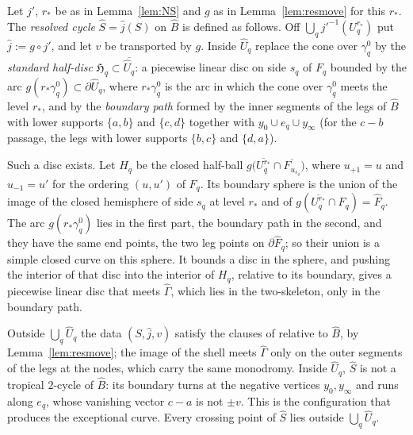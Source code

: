 \begin{definition}\label{def:resolvedcycle}
Let $j'$, $r_*$ be as in Lemma~\ref{lem:NS} and $g$ as in Lemma~\ref{lem:resmove} for this $r_*$. The \emph{resolved
cycle} $\hat S=\hat j(S)$ on $\widehat B$ is defined as follows. Off $\bigcup_qj'^{-1}(U^{r_*}_q)$ put $\hat j:=g\circ j'$, and let $v$ be
transported by $g$. Inside $\widehat U_q$ replace the cone over $\gamma^0_q$ by the \emph{standard half-disc}
$\mathfrak H_q\subset\overline{\widehat U_q}$: a piecewise linear disc on side $s_q$ of $F_q$ bounded by the arc
$g(r_*\gamma^0_q)\subset\partial\widehat U_q$, where $r_*\gamma^0_q$ is the arc in which the cone over $\gamma^0_q$ meets the
level $r_*$, and by the \emph{boundary path} formed by the inner segments of the legs of $\widehat B$ with lower supports
$\{a,b\}$ and $\{c,d\}$ together with $y_0\cup e_q\cup y_\infty$ (for the $c-b$ passage, the legs with lower supports
$\{b,c\}$ and $\{d,a\}$).
\end{definition}

Such a disc exists. Let $H_q$ be the closed half-ball $g\bigl(\overline{U^{r_*}_q}\cap\overline{F_{u_{s_q}}}\bigr)$, where
$u_{+1}=u$ and $u_{-1}=u'$ for the ordering $(u,u')$ of $F_q$. Its boundary sphere is the union of the image of the closed
hemisphere of side $s_q$ at level $r_*$ and of $g(\overline{U^{r_*}_q}\cap F_q)=\widehat F_q$. The arc $g(r_*\gamma^0_q)$ lies in
the first part, the boundary path in the second, and they have the same end points, the two leg points on
$\partial\widehat F_q$; so their union is a simple closed curve on this sphere. It bounds a disc in the sphere, and pushing
the interior of that disc into the interior of $H_q$, relative to its boundary, gives a piecewise linear disc that meets
$\widehat\Gamma$, which lies in the two-skeleton, only in the boundary path.

Outside $\bigcup_q\widehat U_q$ the data $(S,\hat j,v)$ satisfy the clauses of \cite[Def.~7.2]{CBM} relative to $\widehat B$,
by Lemma~\ref{lem:resmove}; the image of the shell meets $\widehat\Gamma$ only on the outer segments of the legs at the nodes,
which carry the same monodromy. Inside $\widehat U_q$, $\hat S$ is not a tropical $2$-cycle of $\widehat B$: its boundary turns
at the negative vertices $y_0,y_\infty$ and runs along $e_q$, whose vanishing vector $c-a$ is not $\pm v$. This is the
configuration that produces the exceptional curve. Every crossing point of $\hat S$ lies outside $\bigcup_q\widehat U_q$.

